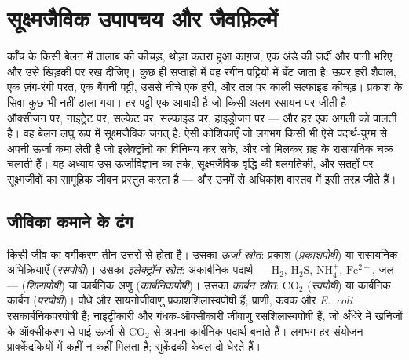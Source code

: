 \chapter{सूक्ष्मजैविक उपापचय और जैवफ़िल्में}\label{ch:b2:microbial-metabolism}

काँच के किसी बेलन में तालाब की कीचड़, थोड़ा कतरा हुआ काग़ज़, एक अंडे की
ज़र्दी और पानी भरिए और उसे खिड़की पर रख दीजिए। कुछ ही सप्ताहों में वह
रंगीन पट्टियों में बँट जाता है: ऊपर हरी शैवाल, एक ज़ंग-रंगी परत, एक
बैंगनी पट्टी, उससे नीचे एक हरी, और तल पर काली सल्फाइड कीचड़। प्रकाश के
सिवा कुछ भी नहीं डाला गया। हर पट्टी एक आबादी है जो किसी अलग रसायन पर
जीती है --- ऑक्सीजन पर, नाइट्रेट पर, सल्फेट पर, सल्फाइड पर, हाइड्रोजन
पर --- और हर एक अगली को पालती है। वह बेलन लघु रूप में सूक्ष्मजैविक जगत्
है: ऐसी कोशिकाएँ जो लगभग किसी भी ऐसे पदार्थ-युग्म से अपनी ऊर्जा कमा
लेती हैं जो इलेक्ट्रॉनों का विनिमय कर सके, और जो मिलकर ग्रह के रासायनिक
चक्र चलाती हैं। यह अध्याय उस ऊर्जाविज्ञान का तर्क, सूक्ष्मजैविक वृद्धि
की बलगतिकी, और सतहों पर सूक्ष्मजीवों का सामूहिक जीवन प्रस्तुत करता है
--- और उनमें से अधिकांश वास्तव में इसी तरह जीते हैं।

\section{जीविका कमाने के ढंग}

\begin{definition}[पोषी प्रकार]\label{def:b2:microbial-metabolism:trophic}
किसी जीव का वर्गीकरण तीन उत्तरों से होता है। उसका \emph{ऊर्जा स्रोत}:
प्रकाश (\emph{प्रकाशपोषी}) या रासायनिक अभिक्रियाएँ (\emph{रसपोषी})।
उसका \emph{इलेक्ट्रॉन स्रोत}: अकार्बनिक पदार्थ --- $\mathrm{H_2}$,
$\mathrm{H_2S}$, $\mathrm{NH_4^+}$, $\mathrm{Fe^{2+}}$, जल ---
(\emph{शिलापोषी}) या कार्बनिक अणु (\emph{कार्बनिकपोषी})। उसका
\emph{कार्बन स्रोत}: $\mathrm{CO_2}$ (\emph{स्वपोषी}) या कार्बनिक
कार्बन (\emph{परपोषी})। पौधे और सायनोजीवाणु
प्रकाशशिलास्वपोषी हैं; प्राणी, कवक और \emph{E.~coli}
रसकार्बनिकपरपोषी हैं; नाइट्रीकारी और गंधक-ऑक्सीकारी
जीवाणु रसशिलास्वपोषी हैं, जो अँधेरे में खनिजों के ऑक्सीकरण से पाई ऊर्जा
से $\mathrm{CO_2}$ से अपना कार्बनिक पदार्थ बनाते हैं। लगभग हर संयोजन
प्राक्केंद्रकियों में कहीं न कहीं मिलता है; सुकेंद्रकी केवल दो घेरते हैं।
\end{definition}

